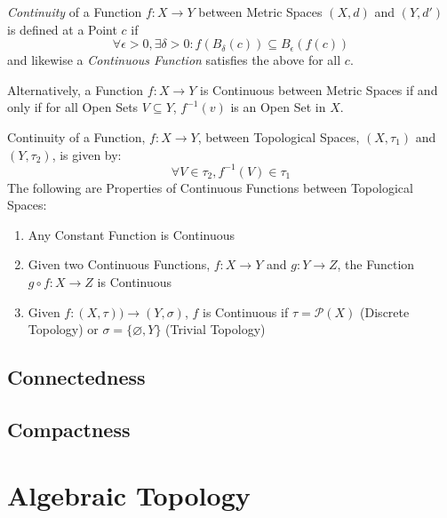 \documentclass{article}
\begin{document}
\emph{Continuity} of a Function $f : X \rightarrow Y$ between Metric
Spaces $(X,d)$ and $(Y,d')$ is defined at a Point $c$
if
\[
    \forall \epsilon > 0, \exists \delta > 0 :
    f (B_{\delta}(c)) \subseteq B_{\epsilon}(f(c))
\]
and likewise a \emph{Continuous Function} satisfies the above for all
$c$.

Alternatively, a Function $f: X \rightarrow Y$ is Continuous between
Metric Spaces if and only if for all Open Sets $V \subseteq Y$,
$f^{-1}(v)$ is an Open Set in $X$.

Continuity of a Function, $f : X \rightarrow Y$, between Topological
Spaces, $(X,\tau_1)$ and $(Y,\tau_2)$, is given by:
\[
    \forall V \in \tau_2, f^{-1}(V) \in \tau_1
\]
The following are Properties of Continuous Functions between
Topological Spaces:
\begin{enumerate}
    \item Any Constant Function is Continuous
    \item Given two Continuous Functions, $f : X \rightarrow Y$ and $g
      : Y \rightarrow Z$, the Function $g \circ f : X \rightarrow Z$ is
      Continuous
    \item Given $f : (X, \tau)) \rightarrow (Y, \sigma)$, $f$ is
      Continuous if $\tau = \mathcal{P}(X)$ (Discrete Topology) or $\sigma =
      \{\varnothing, Y\}$ (Trivial Topology)
\end{enumerate}

\subsection{Connectedness}\label{subsec:connectedness}

\subsection{Compactness}\label{subsec:compactness}

\section{Algebraic Topology}\label{sec:algebraic_topology}
\end{document}
